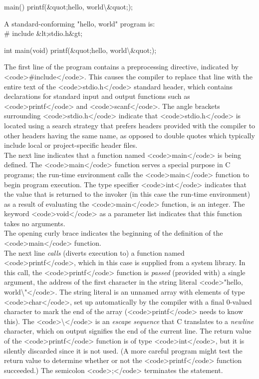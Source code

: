 \documentclass{article}\usepackage{titlesec}
\begin{document}
main()
{
    printf(&quot;hello, world\textbackslash &quot;);
}

A standard-conforming "hello, world" program is:
\\

\# include &lt;stdio.h&gt;

int main(void)
{
    printf(&quot;hello, world\textbackslash &quot;);
}

The first line of the program contains a preprocessing directive, indicated by <code>\#include</code>.  This causes the compiler to replace that line with the entire text of the <code>stdio.h</code> standard header, which contains declarations for standard input and output functions such as <code>printf</code> and <code>scanf</code>. The angle brackets surrounding <code>stdio.h</code> indicate that <code>stdio.h</code> is located using a search strategy that prefers headers provided with the compiler to other headers having the same name, as opposed to double quotes which typically include local or project-specific header files.
\\
The next line indicates that a function named <code>main</code> is being defined. The <code>main</code> function serves a special purpose in C programs; the run-time environment calls the <code>main</code> function to begin program execution. The type specifier <code>int</code> indicates that the value that is returned to the invoker (in this case the run-time environment) as a result of evaluating the <code>main</code> function, is an integer. The keyword <code>void</code> as a parameter list indicates that this function takes no arguments.
\\
The opening curly brace indicates the beginning of the definition of the <code>main</code> function.
\\
The next line \emph{calls} (diverts execution to) a function named <code>printf</code>, which in this case is supplied from a system library.  In this call, the <code>printf</code> function is \emph{passed} (provided with) a single argument, the address of the first character in the string literal <code>"hello, world\textbackslash "</code>. The string literal is an unnamed array with elements of type <code>char</code>, set up automatically by the compiler with a final 0-valued character to mark the end of the array (<code>printf</code> needs to know this). The <code>\textbackslash </code> is an \emph{escape sequence} that C translates to a \emph{newline} character, which on output signifies the end of the current line.  The return value of the <code>printf</code> function is of type <code>int</code>, but it is silently discarded since it is not used. (A more careful program might test the return value to determine whether or not the <code>printf</code> function succeeded.) The semicolon <code>;</code> terminates the statement.
\end{document}
